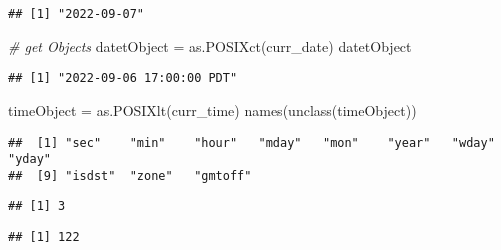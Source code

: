 \documentclass[
]{article}
\newenvironment{Shaded}{\begin{snugshade}}{\end{snugshade}}
\newcommand{\CommentTok}[1]{\textcolor[rgb]{0.56,0.35,0.01}{\textit{#1}}}
\newcommand{\FunctionTok}[1]{\textcolor[rgb]{0.00,0.00,0.00}{#1}}
\newcommand{\NormalTok}[1]{#1}
\newcommand{\OtherTok}[1]{\textcolor[rgb]{0.56,0.35,0.01}{#1}}
\newcommand{\SpecialCharTok}[1]{\textcolor[rgb]{0.00,0.00,0.00}{#1}}
\begin{document}
\begin{verbatim}
## [1] "2022-09-07"
\end{verbatim}

\begin{Shaded}
\begin{Highlighting}[]
\CommentTok{\# get Objects}
\NormalTok{datetObject }\OtherTok{=} \FunctionTok{as.POSIXct}\NormalTok{(curr\_date)}
\NormalTok{datetObject}
\end{Highlighting}
\end{Shaded}

\begin{verbatim}
## [1] "2022-09-06 17:00:00 PDT"
\end{verbatim}

\begin{Shaded}
\begin{Highlighting}[]
\NormalTok{timeObject }\OtherTok{=} \FunctionTok{as.POSIXlt}\NormalTok{(curr\_time)}
\FunctionTok{names}\NormalTok{(}\FunctionTok{unclass}\NormalTok{(timeObject))}
\end{Highlighting}
\end{Shaded}

\begin{verbatim}
##  [1] "sec"    "min"    "hour"   "mday"   "mon"    "year"   "wday"   "yday"  
##  [9] "isdst"  "zone"   "gmtoff"
\end{verbatim}

\begin{Shaded}
\end{Shaded}

\begin{verbatim}
## [1] 3
\end{verbatim}

\begin{Shaded}
\end{Shaded}

\begin{verbatim}
## [1] 122
\end{verbatim}

\begin{Shaded}
\end{Shaded}
\end{document}
